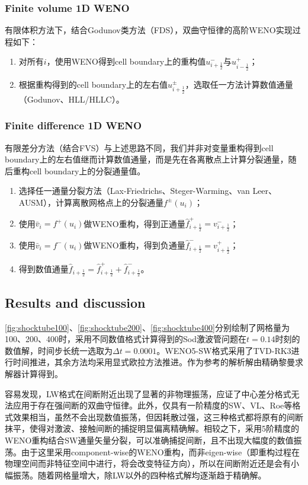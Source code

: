 \documentclass[11pt]{article}
\begin{document}
\subsubsection{Finite volume 1D WENO}
有限体积方法下，结合Godunov类方法（FDS），双曲守恒律的高阶WENO实现过程如下：
\begin{enumerate}
	\item 对所有$i$，使用WENO得到cell boundary上的重构值$u_{i+\frac{1}{2}}^-$与$u_{i-\frac{1}{2}}^+$；
	\item 根据重构得到的cell boundary上的左右值$u_{i+\frac{1}{2}}^\pm$，选取任一方法计算数值通量（Godunov、HLL/HLLC）。
\end{enumerate}

\subsubsection{Finite difference 1D WENO}
有限差分方法（结合FVS）与上述思路不同，我们并非对变量重构得到cell boundary上的左右值继而计算数值通量，而是先在各离散点上计算分裂通量，随后重构cell boundary上的分裂通量值。
\begin{enumerate}
	\item 选择任一通量分裂方法（Lax-Friedrichs、Steger-Warming、van Leer、AUSM），计算离散网格点上的分裂通量$f^\pm(u_i)$；
	\item 使用$\bar{v}_i=f^+(u_i)$做WENO重构，得到正通量$\hat{f}^+_{i+\frac{1}{2}}=v^-_{i+\frac{1}{2}}$；
	\item 使用$\bar{v}_i=f^-(u_i)$做WENO重构，得到负通量$\hat{f}^-_{i+\frac{1}{2}}=v^+_{i+\frac{1}{2}}$；
	\item 得到数值通量$\hat{f}_{i+\frac{1}{2}}=\hat{f}^+_{i+\frac{1}{2}}+\hat{f}^-_{i+\frac{1}{2}}$。
\end{enumerate}

\subsection{Results and discussion}
\autoref{fig:shocktube100}、\autoref{fig:shocktube200}、\autoref{fig:shocktube400}分别绘制了网格量为100、200、400时，采用不同数值格式计算得到的Sod激波管问题在$t=0.14$时刻的数值解，时间步长统一选取为$\Delta t=0.0001$。WENO5-SW格式采用了TVD-RK3进行时间推进，其余方法均采用显式欧拉方法推进。作为参考的解析解由精确黎曼求解器计算得到。

容易发现，LW格式在间断附近出现了显著的非物理振荡，应证了中心差分格式无法应用于存在强间断的双曲守恒律。此外，仅具有一阶精度的SW、VL、Roe等格式效果相当，虽然不会出现数值振荡，但因耗散过强，这三种格式都将原有的间断抹平，使得对激波、接触间断的捕捉明显偏离精确解。相较之下，采用5阶精度的WENO重构结合SW通量矢量分裂，可以准确捕捉间断，且不出现大幅度的数值振荡。由于这里采用component-wise的WENO重构，而非eigen-wise（即重构过程在物理空间而非特征空间中进行，将会改变特征方向），所以在间断附近还是会有小幅振荡。随着网格量增大，除LW以外的四种格式解均逐渐趋于精确解。
\end{document}
